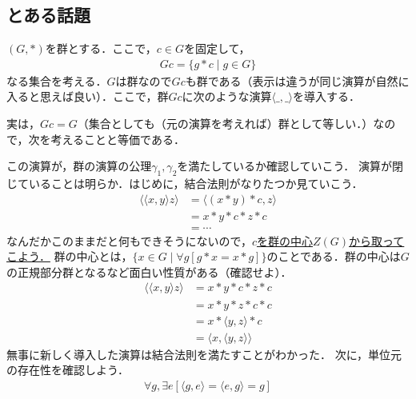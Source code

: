 \documentclass[dvipdfmx,12pt]{jsarticle}
\begin{document}
\subsection*{とある話題}
$(G,*)$を群とする．ここで，$c \in G$を固定して，
\begin{align*}
Gc = \{g*c \mid g \in G\}
\end{align*}
なる集合を考える．$G$は群なので$Gc$も群である（表示は違うが同じ演算が自然に入ると思えば良い）．ここで，群$Gc$に次のような演算$\langle \_, \_ \rangle$を導入する．
%
\begin{center}
\end{center}
%
実は，$Gc = G$（集合としても（元の演算を考えれば）群として等しい．）なので，次を考えることと等価である．
%
\begin{center}
\end{center}
%
この演算が，群の演算の公理$\gamma_1, \gamma_2$を満たしているか確認していこう．
演算が閉じていることは明らか．はじめに，結合法則がなりたつか見ていこう．
\begin{align*}
\langle \langle x, y \rangle z \rangle &= \langle (x*y)*c , z\rangle \\
&= x*y*c*z*c \\
&= \cdots
\end{align*}
なんだかこのままだと何もできそうにないので，\underline{$c$を群の中心$Z(G)$から取ってこよう．}
群の中心とは，$\{ x \in G \mid \forall g [g*x = x*g] \}$のことである．群の中心は$G$の正規部分群となるなど面白い性質がある（確認せよ）．
\begin{align*}
\langle \langle x, y \rangle z \rangle &= x*y*c*z*c \\
&= x * y*z*c *c \\
&= x * \langle y,z \rangle * c \\
&= \langle x, \langle y,z \rangle \rangle
\end{align*}
無事に新しく導入した演算は結合法則を満たすことがわかった．
次に，単位元の存在性を確認しよう．
\begin{align*}
\forall g,\exists e [\langle g,e \rangle = \langle e,g \rangle = g]
\end{align*}
\end{document}
